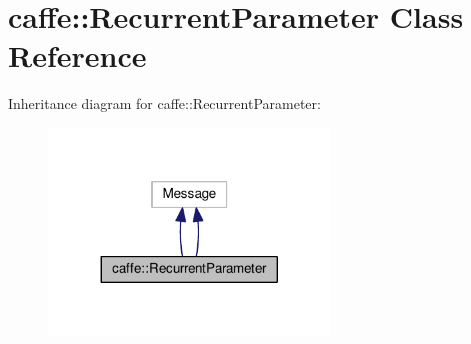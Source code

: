 \hypertarget{classcaffe_1_1_recurrent_parameter}{}\section{caffe\+:\+:Recurrent\+Parameter Class Reference}
\label{classcaffe_1_1_recurrent_parameter}


Inheritance diagram for caffe\+:\+:Recurrent\+Parameter\+:
\nopagebreak
\begin{figure}[H]
\begin{center}
\leavevmode
\includegraphics[width=212pt]{classcaffe_1_1_recurrent_parameter__inherit__graph}
\end{center}
\end{figure}
